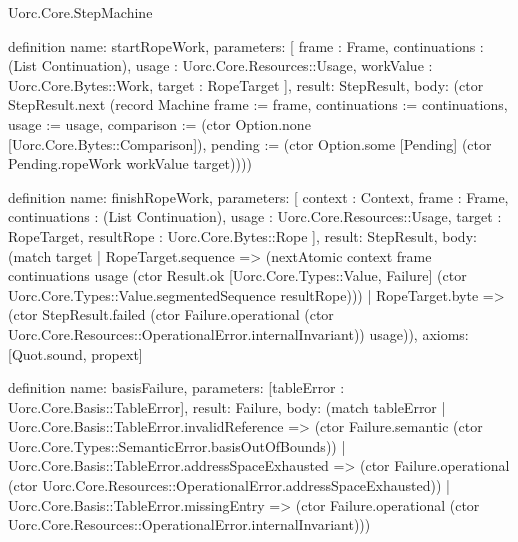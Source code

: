 \begin{lexlean}{Uorc.Core.StepMachine}
\begin{semanticmodule}
definition{
  name: startRopeWork,
  parameters: [
    frame : Frame,
    continuations : (List Continuation),
    usage : Uorc.Core.Resources::Usage,
    workValue : Uorc.Core.Bytes::Work,
    target : RopeTarget
  ],
  result: StepResult,
  body: (ctor StepResult.next (record Machine {frame := frame, continuations := continuations, usage := usage, comparison := (ctor Option.none [Uorc.Core.Bytes::Comparison]), pending := (ctor Option.some [Pending] (ctor Pending.ropeWork workValue target))}))
}

definition{
  name: finishRopeWork,
  parameters: [
    context : Context,
    frame : Frame,
    continuations : (List Continuation),
    usage : Uorc.Core.Resources::Usage,
    target : RopeTarget,
    resultRope : Uorc.Core.Bytes::Rope
  ],
  result: StepResult,
  body: (match target
    | RopeTarget.sequence => (nextAtomic context frame continuations usage (ctor Result.ok [Uorc.Core.Types::Value, Failure] (ctor Uorc.Core.Types::Value.segmentedSequence resultRope)))
    | RopeTarget.byte => (ctor StepResult.failed (ctor Failure.operational (ctor Uorc.Core.Resources::OperationalError.internalInvariant)) usage)),
  axioms: [Quot.sound, propext]
}

definition{
  name: basisFailure,
  parameters: [tableError : Uorc.Core.Basis::TableError],
  result: Failure,
  body: (match tableError
    | Uorc.Core.Basis::TableError.invalidReference => (ctor Failure.semantic (ctor Uorc.Core.Types::SemanticError.basisOutOfBounds))
    | Uorc.Core.Basis::TableError.addressSpaceExhausted => (ctor Failure.operational (ctor Uorc.Core.Resources::OperationalError.addressSpaceExhausted))
    | Uorc.Core.Basis::TableError.missingEntry => (ctor Failure.operational (ctor Uorc.Core.Resources::OperationalError.internalInvariant)))
}


\end{semanticmodule}
\end{lexlean}
